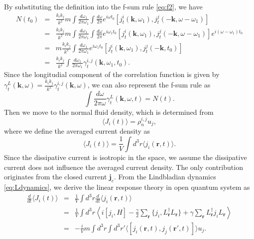\documentclass[aps,superscriptaddress,notitlepage,longbibliography]{revtex4-1}
\begin{document}
By substituting the definition into the f-sum rule \eqref{eq:f2},
we have 
\begin{eqnarray}
N(t_{0}) & = & \frac{k_{i}k_{j}}{k^{2}}m\int\frac{d\omega_{1}}{2\pi\omega_{1}}\int\frac{d\omega}{2\pi}e^{i\omega t_{0}}[j_{t}^{i}(\bm{k},\omega_{1}),j_{t}^{j}(-\bm{k},\omega-\omega_{1})]\nonumber \\
 & = & \frac{k_{i}k_{j}}{k^{2}}m\int\frac{d\omega_{1}}{2\pi\omega_{1}}\int\frac{d\omega}{2\pi}e^{i\omega_{1}t_{0}}[j_{t}^{i}(\bm{k},\omega_{1}),j_{t}^{j}(-\bm{k},\omega-\omega_{1})]e^{i(\omega-\omega_{1})t_{0}}\nonumber \\
 & = & m\frac{k_{i}k_{j}}{k^{2}}\int\frac{d\omega_{1}}{2\pi\omega_{1}}e^{i\omega_{1}t_{0}}[j_{t}^{i}(\bm{k},\omega_{1}),j_{t}^{j}(-\bm{k},t_{0})]\nonumber \\
 & = & \frac{k_{i}k_{j}}{k^{2}}\int\frac{d\omega_{1}}{2\pi\omega_{1}}\gamma_{t}^{i,j}(\bm{k},\omega_{1},t_{0}).
\end{eqnarray}
Since the longitudial component of the correlation function is given
by $\gamma_{t}^{L}(\bm{k},\omega)=\frac{k_{i}k_{j}}{k^{2}}\gamma_{t}^{i,j}(\bm{k},\omega)$,
we can also represent the f-sum rule as 
\begin{equation}
\int\frac{d\omega}{2\pi\omega}\gamma_{t}^{L}(\bm{k},\omega,t)=N(t).\label{eq:total}
\end{equation}
Then we move to the normal fluid density, which is determined from
\begin{equation}
\langle J_{i}(t)\rangle=\rho_{n}^{i,j}u_{j},
\end{equation}
where we define the averaged current density as \citep{SM_footnote}
\begin{equation}
\langle J_{i}(t)\rangle=\frac{1}{V}\int d^{3}r\langle j_{i}(\bm{r},t)\rangle.
\end{equation}
Since the dissipative current is isotropic in the space, we assume
the dissipative current does not influence the averaged current density.
The only contribution originates from the closed current $\bm{j}_{c}$.
From the Lindbladian dynamics \eqref{eq:Ldynamics}, we derive the
linear response theory in open quantum system as 
\begin{eqnarray}
\frac{d}{dt}\langle J_{i}(t)\rangle & = & \frac{1}{V}\int d^{3}r\frac{d}{dt}\langle j_{i}(\bm{r},t)\rangle\nonumber \\
 & = & \frac{1}{V}\int d^{3}r\left\langle i[j_{i},H]-\frac{\gamma}{2}\sum_{\bm{r}}\{j_{i},L_{\bm{r}}^{\dagger}L_{\bm{r}}\}+\gamma\sum_{\bm{r}}L_{\bm{r}}^{\dagger}j_{i}L_{\bm{r}}\right\rangle \nonumber \\
 & = & -\frac{i}{V}m\int d^{3}r\int d^{3}r'\langle[j_{i}(\bm{r},t),j_{j}(\bm{r}',t)]\rangle u_{j}.
\end{eqnarray}
\end{document}
